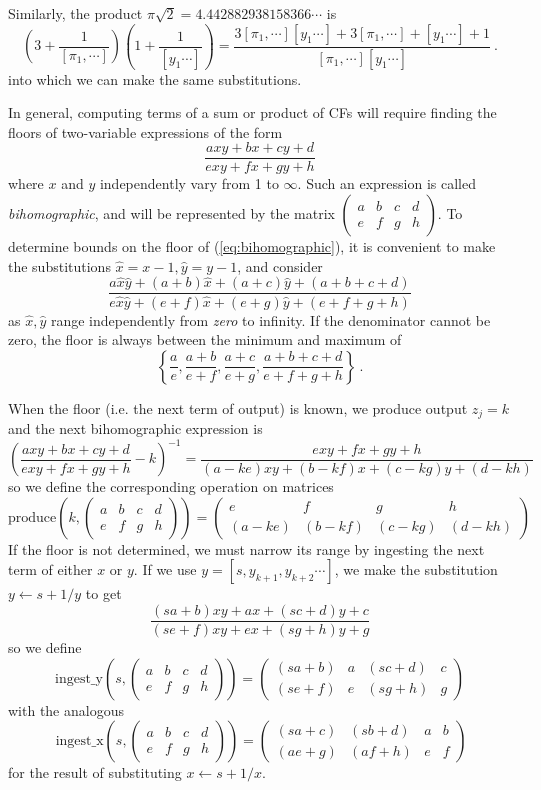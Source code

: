 \documentclass[11pt, oneside]{amsart}   	%
\newcommand{\bihomographic}[8]{\left(\begin{smallmatrix}#1&#2&#3&#4\\#5&#6&#7&#8\end{smallmatrix}\right)}
\newcommand{\abcd}{\left(
\begin{smallmatrix} 
a & b & c & d\\ 
e & f & g & h
\end{smallmatrix}
\right)}
\begin{document}
Similarly, the product $\pi\sqrt{2}=4.442882938158366\cdots$ is
\begin{equation}\label{eq:cfMult}
(3 + \frac{1}{[\pi_1,\cdots]})(1 + \frac{1}{[y_1\cdots]}) 
  = \frac{ 3[\pi_1,\cdots][y_1\cdots] + 3[\pi_1,\cdots] + [y_1\cdots] +1 }{[\pi_1,\cdots][y_1\cdots] }\ .
\end{equation}
into which we can make the same substitutions. 

In general, computing terms of a sum or product of CFs will require finding the floors of two-variable expressions of the form
\begin{equation}\label{eq:bihomographic}
\frac{axy + bx + cy + d}{exy + fx + gy + h}
\end{equation}
where $x$ and $y$ independently vary from 1 to $\infty$. Such an expression is called \emph{bihomographic}, and will be represented by the matrix $\abcd$. To determine bounds on the floor of (\ref{eq:bihomographic}), it is convenient to make the substitutions $\hat{x} = x-1, \hat{y} = y-1$, and consider
\[
\frac{a\hat{x}\hat{y} + (a+b)\hat{x} + (a+c)\hat{y} + (a+b+c+d)}{e\hat{x}\hat{y} + (e+f)\hat{x} + (e+g)\hat{y} + (e+f+g+h)}
\]
as $\hat{x}, \hat{y}$ range independently from \emph{zero} to infinity. If the denominator cannot be zero, the floor is always between the minimum and maximum of
\[
\left\{ \frac{a}{e},\frac{a+b}{e+f},\frac{a+c}{e+g},\frac{a+b+c+d}{e+f+g+h} \right\}\ .
\]

When the floor (i.e. the next term of output) is known, we produce output $z_j=k$ and the next bihomographic expression is
\[
\left(\frac{axy + bx + cy + d}{exy + fx + gy + h} - k\right)^{-1} = \frac{exy + fx + gy + h}{(a-ke)xy + (b-kf)x + (c-kg)y + (d-kh)}
\]
so we define the corresponding operation on matrices
\[
\mbox{produce}(k, \abcd) = \bihomographic{e}{f}{g}{h}{(a-ke)}{(b-kf)}{(c-kg)}{(d-kh)}
\]
 If the floor is not determined, we must narrow its range by ingesting the next term of either $x$ or $y$. If we use $y = [s,y_{k+1},y_{k+2}\cdots]$, we make the substitution $y \leftarrow s + 1/y$ to get
\[
\frac{(sa+b)xy + ax + (sc+d)y + c}{(se+f)xy + ex + (sg+h)y + g}
\]
so we define
\[
\mbox{ingest\_y}(s, \abcd) = \bihomographic{(sa+b)}{a}{(sc+d)}{c}{(se+f)}{e}{(sg+h)}{g}
\]
with the analogous 
\[\
\mbox{ingest\_x}(s, \abcd) = \bihomographic{(sa+c)}{(sb+d)}{a}{b} {(ae+g)}{(af+h)}{e}{f}
\] 
for the result of substituting $x \leftarrow s + 1/x$.
\end{document}
